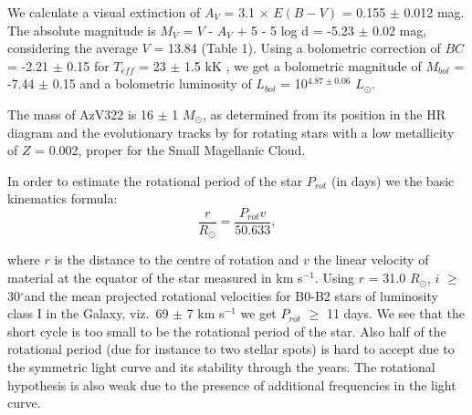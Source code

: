 \documentclass[useAMS,usenatbib]{mn2e}
\def\dg{$^{\circ}$}
\def\msun{\hbox{$M_{\odot}$}~}
\def\rsun{$R_{\odot}$}
\def\msun{$M_{\odot}$}
\begin{document}
We calculate a visual extinction of $A_V$ = 3.1 $\times$ $E(B-V)$ = 0.155 $\pm$ 0.012 mag. The absolute magnitude is $M_V$ = $V$ - $A_V$ + 5 - 5 log d =  -5.23 $\pm$ 0.02 mag, considering the average $V$ = 13.84 (Table 1). 
Using a bolometric correction of $BC$ = -2.21 $\pm$ 0.15 for $T_{eff}$ = 23 $\pm$ 1.5 kK  \citep[][]{1996ApJ...469..355F},
we get a bolometric magnitude of $M_{bol}$ = -7.44 $\pm$ 0.15 and a bolometric  luminosity of $L_{bol}$ = 10$^{4.87 \pm 0.06}$ $L_{\odot}$.


The mass of  AzV322 is 16 $\pm$ 1 \msun, as determined from its position in the HR diagram and the evolutionary tracks by \citet{2001A&A...373..555M} for rotating stars with a low metallicity of $Z$ = 0.002, proper for the Small Magellanic Cloud.

In order to  estimate the rotational period of the star  $P_{rot}$ (in days) we  the basic kinematics formula:\\

\begin{equation}
 \frac{r}{R_{\odot}} =  \frac{P_{rot} v}{50.633},
\end{equation}

\noindent
where $r$ is the distance to the centre of rotation and $v$ the linear velocity of material at the equator of the star measured in km s$^{-1}$.
 Using $r$ = 31.0  \rsun, $i$ $\geq$ 30\dg and the mean projected rotational velocities for B0-B2 stars of luminosity class I in the Galaxy, viz.\, 69 $\pm$ 7 km s$^{-1}$ \citep{2002ApJ...573..359A} we get  $P_{rot}$  $\geq$ 11 days.
We see that the short cycle is too small to be the rotational period of the star. Also half of the rotational period (due for instance to two stellar spots) is hard to accept  due to the symmetric light curve and its stability through the years. The rotational hypothesis is also weak due to the presence of additional frequencies in the light curve.
\end{document}
